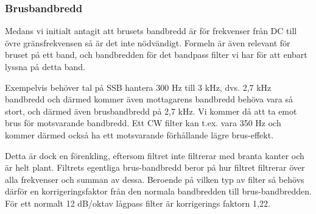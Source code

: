 \subsubsection{Brusbandbredd}
\begin{rev-nytt}[MAD]

Medans vi initialt antagit att brusets bandbredd är för frekvenser
från DC till övre gränsfrekvensen så är det inte nödvändigt. Formeln är även
relevant för bruset på ett band, och bandbredden för det bandpass filter vi har
för att enbart lyssna på detta band.

Exempelvis behöver tal på SSB hantera 300 Hz till 3 kHz, dvs. 2,7 kHz
bandbredd och därmed kommer även mottagarens bandbredd behöva vara så stort,
och därmed även brusbandbredd på 2,7 kHz. Vi kommer då att ta emot brus för
motsvarande bandbredd. Ett CW filter kan t.ex. vara 350 Hz och kommer därmed
också ha ett motsvarande förhållande lägre brus-effekt.

Detta är dock en förenkling, eftersom filtret inte filtrerar med branta kanter
och är helt plant. Filtrets egentliga brus-bandbredd beror på hur filtret
filtrerar över alla frekvenser och summan av dessa. Beroende på vilken typ av
filter så behövs därför en korrigeringsfaktor från den normala bandbredden
till brus-bandbredden. För ett normalt 12 dB/oktav lågpass filter är
korrigerings faktorn 1,22.

\end{rev-nytt}
